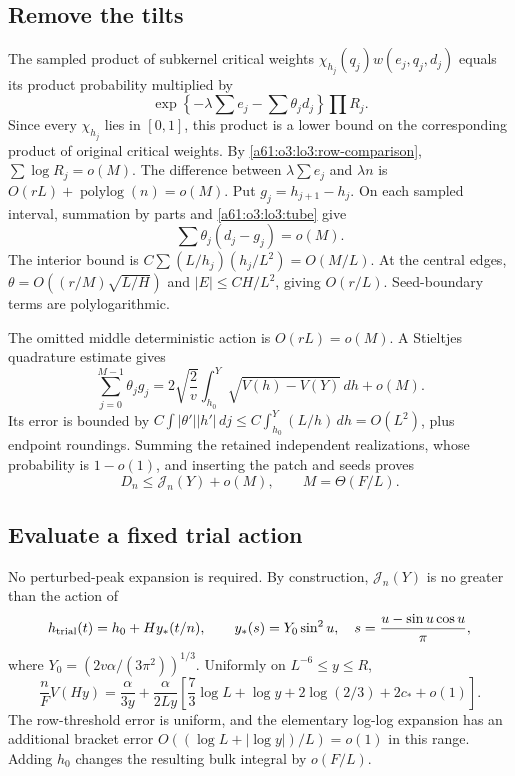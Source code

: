 \documentclass[11pt,letterpaper]{article}
\numberwithin{equation}{section}
\theoremstyle{remark}\newtheorem{remark}[theorem]{Remark}
\begin{document}
\subsection{Remove the tilts}

The sampled product of subkernel critical weights
$\chi_{h_j}(q_j)w(e_j,q_j,d_j)$ equals its product probability
multiplied by
\[
 \exp\left\{-\lambda\sum e_j-\sum\theta_jd_j\right\}
                      \prod R_j.
\]
Since every $\chi_{h_j}$ lies in $[0,1]$, this product is a lower
bound on the corresponding product of original critical weights.
By \eqref{a61:o3:lo3:row-comparison}, $\sum\log R_j=o(M)$.
The difference between $\lambda\sum e_j$ and $\lambda n$ is
$O(rL)+\operatorname{polylog}(n)=o(M)$.
Put $g_j=h_{j+1}-h_j$. On each sampled interval, summation by parts
and \eqref{a61:o3:lo3:tube} give
\begin{equation}\label{a61:o3:lo3:tilt-cancellation}
 \sum\theta_j(d_j-g_j)=o(M).
\end{equation}
The interior bound is
$C\sum(L/h_j)(h_j/L^2)=O(M/L)$.
At the central edges,
$\theta=O((r/M)\sqrt{L/H})$ and $|E|\le CH/L^2$, giving
$O(r/L)$. Seed-boundary terms are polylogarithmic.

The omitted middle deterministic action is $O(rL)=o(M)$. A Stieltjes
quadrature estimate gives
\begin{equation}\label{a61:o3:lo3:action-sum}
 \sum_{j=0}^{M-1}\theta_jg_j
  =2\sqrt{\frac2v}\int_{h_0}^Y\sqrt{V(h)-V(Y)}\,dh+o(M).
\end{equation}
Its error is bounded by
$C\int |\theta'||h'|\,dj\le C\int_{h_0}^Y(L/h)\,dh=O(L^2)$,
plus endpoint roundings.
Summing the retained independent realizations, whose probability is
$1-o(1)$, and inserting the patch and seeds proves
\begin{equation}\label{a61:o3:lo3:action-bound}
 D_n\le\mathcal J_n(Y)+o(M),\qquad M=\Theta(F/L).
\end{equation}

\subsection{Evaluate a fixed trial action}

No perturbed-peak expansion is required. By construction,
$\mathcal J_n(Y)$ is no greater than the action of
\[
 h_{\rm trial}(t)=h_0+H y_*(t/n),\qquad
 y_*(s)=Y_0\sin^2u,\quad
 s=\frac{u-\sin u\cos u}{\pi},
\]
where $Y_0=(2v\alpha/(3\pi^2))^{1/3}$.
Uniformly on $L^{-6}\le y\le R$,
\begin{equation}\label{a61:o3:lo3:trial-potential}
 \frac nF V(Hy)=\frac{\alpha}{3y}
  +\frac{\alpha}{2Ly}
    \left[\frac73\log L+\log y+2\log(2/3)+2c_*+o(1)\right].
\end{equation}
The row-threshold error is uniform, and the elementary log-log
expansion has an additional bracket error
$O((\log L+|\log y|)/L)=o(1)$ in this range.
Adding $h_0$ changes the resulting bulk integral by $o(F/L)$.
\end{document}
